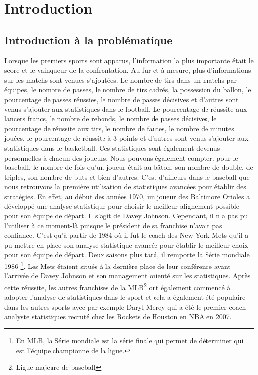\documentclass[12pt]{article}
\begin{document}
\section{Introduction}

\subsection{Introduction à la problématique}
Lorsque les premiers sports sont apparus, l'information la plus importante était le score et le vainqueur de la confrontation.
Au fur et à mesure, plus d'informations sur les matchs sont venues s'ajoutées.
Le nombre de tirs dans un matchs par équipes, le nombre de passes, le nombre de tirs cadrés, la possession du ballon, le pourcentage de passes réussies, le nombre de passes décisives et d'autres sont venus s'ajouter aux statistiques dans le football.
Le pourcentage de réussite aux lancers francs, le nombre de rebonds, le nombre de passes décisives, le pourcentage de réussite aux tirs, le nombre de fautes, le nombre de minutes jouées, le pourcentage de réussite à 3 points et d'autres sont venus s'ajouter aux statistiques dans le basketball.
Ces statistiques sont également devenus personnelles à chacun des joueurs.
Nous pouvons également compter, pour le baseball, le nombre de fois qu'un joueur était au bâton, son nombre de double, de triples, son nombre de buts et bien d'autres.
\newline\newline
C'est d'ailleurs dans le baseball que nous retrouvons la première utilisation de statistiques avancées pour établir des stratégies.
En effet, au début des années 1970, un joueur des Baltimore Orioles a développé une analyse statistique pour choisir le meilleur alignement possible pour son équipe de départ.
Il s'agit de Davey Johnson.
Cependant, il n'a pas pu l'utiliser à ce moment-là puisque le président de sa franchise n'avait pas confiance. C'est qu'à partir de 1984 où il fut le coach des New York Mets qu'il a pu mettre en place son analyse statistique avancée pour établir le meilleur choix pour son équipe de départ. \cite{incPCMag1984}
Deux saisons plus tard, il remporte la Série mondiale 1986 \footnote{En MLB, la Série mondiale est la série finale qui permet de déterminer qui est l'équipe championne de la ligue.}. Les Mets étaient situés à la dernière place de leur conférence avant l'arrivée de Davey Johnson et son management orienté sur les statistiques.
\newline
Après cette réussite, les autres franchises de la MLB\footnote{Ligue majeure de baseball} ont également commencé à adopter l'analyse de statistiques dans le sport et cela a également été populaire dans les autres sports avec par exemple Daryl Morey qui a été le premier coach analyste statistiques recruté chez les Rockets de Houston en NBA en 2007. \cite{DarylMorey13year2020}
\end{document}
